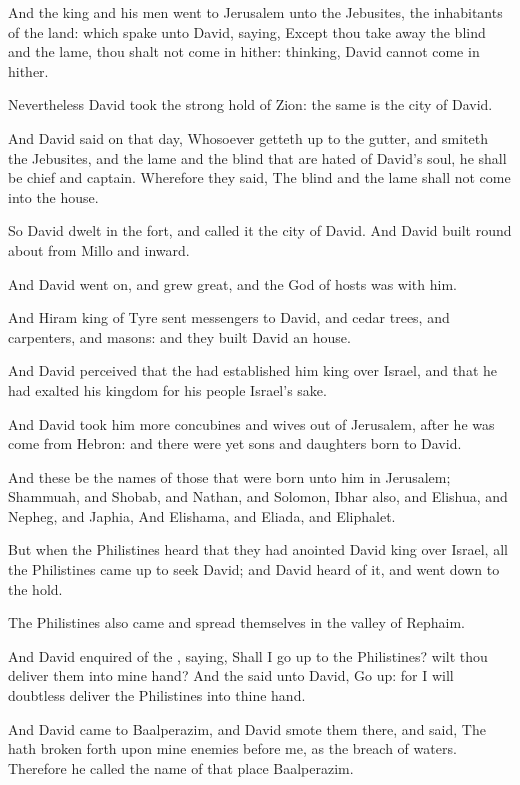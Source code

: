 \Verse And the king and his men went to Jerusalem unto the Jebusites, the inhabitants of the land: which spake unto David, saying, Except thou take away the blind and the lame, thou shalt not come in hither: thinking, David cannot come in hither.

\Verse Nevertheless David took the strong hold of Zion: the same is the city of David.

\Verse And David said on that day, Whosoever getteth up to the gutter, and smiteth the Jebusites, and the lame and the blind that are hated of David's soul, he shall be chief and captain. Wherefore they said, The blind and the lame shall not come into the house.

\Verse So David dwelt in the fort, and called it the city of David. And David built round about from Millo and inward.

\Verse And David went on, and grew great, and the \LORD God of hosts was with him.

\Verse And Hiram king of Tyre sent messengers to David, and cedar trees, and carpenters, and masons: and they built David an house.

\Verse And David perceived that the \LORD had established him king over Israel, and that he had exalted his kingdom for his people Israel's sake.

\Verse And David took him more concubines and wives out of Jerusalem, after he was come from Hebron: and there were yet sons and daughters born to David.

\Verse And these be the names of those that were born unto him in Jerusalem; Shammuah, and Shobab, and Nathan, and Solomon, \Verse Ibhar also, and Elishua, and Nepheg, and Japhia, \Verse And Elishama, and Eliada, and Eliphalet.

\Verse But when the Philistines heard that they had anointed David king over Israel, all the Philistines came up to seek David; and David heard of it, and went down to the hold.

\Verse The Philistines also came and spread themselves in the valley of Rephaim.

\Verse And David enquired of the \LORD, saying, Shall I go up to the Philistines? wilt thou deliver them into mine hand? And the \LORD said unto David, Go up: for I will doubtless deliver the Philistines into thine hand.

\Verse And David came to Baalperazim, and David smote them there, and said, The \LORD hath broken forth upon mine enemies before me, as the breach of waters. Therefore he called the name of that place Baalperazim.

